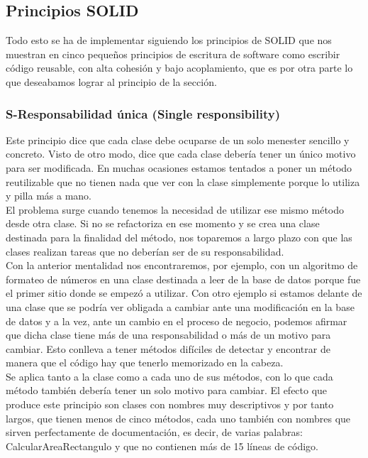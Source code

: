 \documentclass[../pfc.tex]{subfiles}
\begin{document}
	
	\subsection{Principios SOLID}
	
	Todo esto se ha de implementar siguiendo los principios de SOLID\cite{solid} que nos muestran en cinco pequeños principios de escritura de software como escribir código reusable, con alta cohesión y bajo acoplamiento, que es por otra parte lo que deseabamos lograr al principio de la sección.
	
	
	\subsubsection{S-Responsabilidad única (Single responsibility)}
	
	Este principio dice que cada clase debe ocuparse de un solo menester sencillo y concreto. Visto de otro modo, dice que cada clase debería tener un único motivo para ser modificada. En muchas ocasiones estamos tentados a poner un método reutilizable que no tienen nada que ver con la clase simplemente porque lo utiliza y pilla más a mano. \\
	
	El problema surge cuando tenemos la necesidad de utilizar ese mismo método desde otra clase. Si no se refactoriza en ese momento y se crea una clase destinada para la finalidad del método, nos toparemos a largo plazo con que las clases realizan tareas que no deberían ser de su responsabilidad.\\
	
	Con la anterior mentalidad nos encontraremos, por ejemplo, con un algoritmo de formateo de números en una clase destinada a leer de la base de datos porque fue el primer sitio donde se empezó a utilizar. Con otro ejemplo si estamos delante de una clase que se podría ver obligada a cambiar ante una modificación en la base de datos y a la vez, ante un cambio en el proceso de negocio, podemos afirmar que dicha clase tiene más de una responsabilidad o más de un motivo para cambiar. Esto conlleva a tener métodos difíciles de detectar y encontrar de manera que el código hay que tenerlo memorizado en la cabeza.\\
	
	Se aplica tanto a la clase como a cada uno de sus métodos, con lo que cada método también debería tener un solo motivo para cambiar. El efecto que produce este principio son clases con nombres muy descriptivos y por tanto largos, que tienen menos de cinco métodos, cada uno también con nombres que sirven perfectamente de documentación, es decir, de varias palabras: CalcularAreaRectangulo y que no contienen más de 15 líneas de código.\\
	
\end{document}
